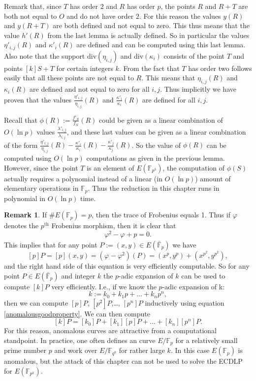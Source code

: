 \documentclass{article}
\numberwithin{equation}{section}
\theoremstyle{definition}
\newtheorem{remark}[theorem]{Remark}
\newcommand{\FF}[1]{{\mathbb F}_{#1}} %
\newcommand{\FFCL}[1]{{\bar {\mathbb F}}_{#1}} %
\newcommand{\frob}[1][]{\varphi_{#1}} %
\begin{document}
Remark that, since $T$ has order $2$ and $R$ has order $p$, the points $R$ and $R+T$ are both not equal to $O$ and do not have order $2$. For this reason the values $y(R)$ and $y(R+T)$ are both defined and not equal to zero. This thus means that the value $h'(R)$ from the last lemma is actually defined. So in particular the values $\eta'_{i,j}(R)$ and $\kappa'_i(R)$ are defined and can be computed using this last lemma. Also note that the support div$(\eta_{i,j})$ and div$(\kappa_i)$ consists of the point $T$ and points $[k]S+T$ for certain integers $k$. From the fact that $T$ has order two follows easily that all these points are not equal to $R$. This means that $\eta_{i,j}(R)$ and $\kappa_i(R)$ are defined and not equal to zero for all $i,j$. Thus implicitly we have proven that the values $\frac{\eta'_{i,j}}{\eta_{i,j}}(R)$ and $\frac{\kappa'_i}{\kappa_i}(R)$ are defined for all $i,j$.\par 
Recall that $\phi(R):=\frac{f'_S}{f_S}(R)$ could be given as a linear combination of $O(\ln p)$ values $\frac{\lambda'_{i,j}}{\lambda_{i,j}}$, and these last values can be given as a linear combination of the form $\frac{\eta'_{i,j}}{\eta_{i,j}}(R)-\frac{\kappa'_i}{\kappa_i}(R)-\frac{\kappa'_j}{\kappa_j}(R)$. So the value of $\phi(R)$ can be computed using $O(\ln p)$ computations as given in the previous lemma. However, since the point $T$ is an element of $E(\FF{p^3})$, the computation of $\phi(S)$ actually requires a polynomial instead of a linear (in $O(\ln p)$) amount of elementary operations in $\FF{p}$. Thus the reduction in this chapter runs in polynomial in $O(\ln p)$ time.

\begin{remark}
If $\#E(\FF{p})=p$, then the trace of Frobenius equals 1. Thus if $\frob$ denotes the $p^\text{th}$ Frobenius morphism, then it is clear that $$\frob^2-\frob+p=0.$$ This implies that for any point $P:=(x,y)\in E(\FFCL{p})$ we have \begin{equation}\label{anomalousgoodproperty}[p]P=[p](x,y)=(\frob-\frob^2)(P)=(x^p,y^p)+(x^{p^2},y^{p^2}),\end{equation} and the right hand side of this equation is very efficiently computable. So for any point $P\in E(\FFCL{p})$ and integer $k$ the $p$-adic expansion of $k$ can be used to compute $[k]P$ very efficiently. I.e., if we know the $p$-adic expansion of k: $$k:=k_0+k_1p+\ldots+k_np^n,$$ then we can compute $[p]P$, $[p^2]P$,\ldots, $[p^n]P$ inductively using equation \ref{anomalousgoodproperty}. We can then compute $$[k]P=[k_0]P+[k_1][p]P+\ldots+[k_n][p^n]P.$$ For this reason, anomalous curves are attractive from a computational standpoint. In practice, one often defines an curve $E/\FF{p}$ for a relatively small prime number $p$ and work over $E/\FF{q^k}$ for rather large $k$. In this case $E(\FF{p})$ is anomalous, but the attack of this chapter can not be used to solve the ECDLP for $E(\FF{p^k})$.  
\end{remark}
\end{document}
